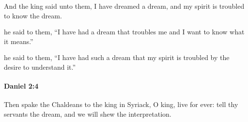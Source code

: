 			\begin{versebox}
					\item[BHS] 
					\item[LXX] 
					\item[ASV] And the king said unto them, I have dreamed a dream, and my spirit is troubled to know the dream.
					\item[NIV] he said to them, “I have had a dream that troubles me and I want to know what it means.”
					\item[NRSV] he said to them, “I have had such a dream that my spirit is troubled by the desire to understand it.”
			\end{versebox}

		\paragraph{Daniel 2:4} %
			\label{DANIEL-2-4}

			Then spake the Chaldeans to the king in Syriack, O king, live for ever: tell thy servants the dream, and we will shew the interpretation.

